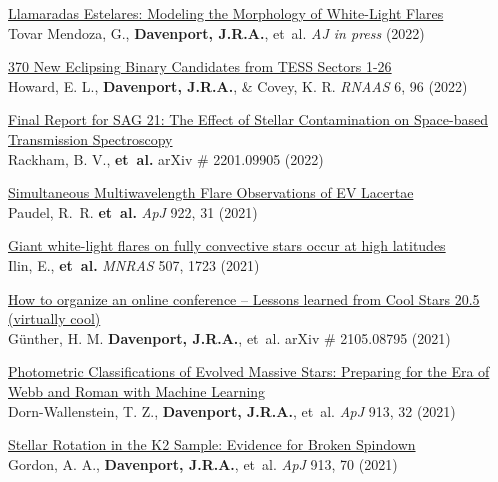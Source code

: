 \documentclass{article}
\begin{document}
\begin{llist}
\begin{etaremune}[leftmargin=10pt]
\item {\sc \href{https://arxiv.org/abs/2205.05706}{\color{NavyBlue}Llamaradas Estelares: Modeling the Morphology of White-Light Flares}}\\
Tovar Mendoza, G., {\bf Davenport,  J.R.A.}, et~al. {\em AJ in press} (2022)

\item {\sc \href{https://iopscience.iop.org/article/10.3847/2515-5172/ac6e42}{\color{NavyBlue}370 New Eclipsing Binary Candidates from TESS Sectors 1-26}}\\
Howard, E. L., {\bf Davenport,  J.R.A.}, \& Covey, K. R. {\em RNAAS} 6, 96  (2022)

\item{\sc \href{https://ui.adsabs.harvard.edu/abs/2022arXiv220109905R/abstract}{\color{NavyBlue} Final Report for SAG 21: The Effect of Stellar Contamination on Space-based Transmission Spectroscopy}}\\
Rackham, B. V., {\bf et~al.}  arXiv \# 2201.09905 (2022)



\item{\sc \href{https://arxiv.org/abs/2108.04753}{\color{NavyBlue} Simultaneous Multiwavelength Flare Observations of EV Lacertae}}\\
Paudel, R.~R. {\bf et~al.} {\em ApJ} 922, 31 (2021)



\item{\sc \href{https://arxiv.org/abs/2108.01917}{\color{NavyBlue} Giant white-light flares on fully convective stars occur at high latitudes}}\\
Ilin, E., {\bf et~al.} {\em MNRAS} 507, 1723 (2021)

\item{\sc \href{https://arxiv.org/abs/2105.08795}{\color{NavyBlue} How to organize an online conference -- Lessons learned from Cool Stars 20.5 (virtually cool)}}\\
G\"{u}nther, H. M. {\bf Davenport,  J.R.A.}, et~al. arXiv \# 2105.08795 (2021)

\item{\sc \href{https://arxiv.org/abs/2102.02829}{\color{NavyBlue} Photometric Classifications of Evolved Massive Stars: Preparing for the Era of Webb and Roman with Machine Learning}}\\
Dorn-Wallenstein, T. Z., {\bf Davenport,  J.R.A.}, et~al.  {\em ApJ} 913, 32 (2021)

\item{\sc \href{https://arxiv.org/abs/2101.07886}{\color{NavyBlue} Stellar Rotation in the K2 Sample: Evidence for Broken Spindown}}\\
Gordon, A. A., {\bf Davenport,  J.R.A.}, et~al.  {\em ApJ} 913, 70 (2021)


\end{etaremune}
\end{llist}
\end{document}
